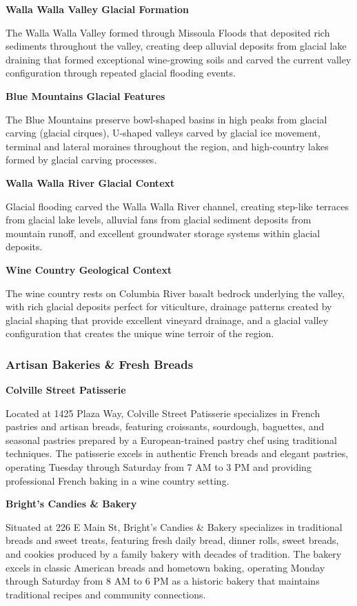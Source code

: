 \documentclass[
  11pt,
  letterpaper,
  DIV=10,
  numbers=noendperiod]{scrartcl}
\begin{document}
\textbf{Walla Walla Valley Glacial Formation}

The Walla Walla Valley formed through Missoula Floods that deposited
rich sediments throughout the valley, creating deep alluvial deposits
from glacial lake draining that formed exceptional wine-growing soils
and carved the current valley configuration through repeated glacial
flooding events.

\textbf{Blue Mountains Glacial Features}

The Blue Mountains preserve bowl-shaped basins in high peaks from
glacial carving (glacial cirques), U-shaped valleys carved by glacial
ice movement, terminal and lateral moraines throughout the region, and
high-country lakes formed by glacial carving processes.

\textbf{Walla Walla River Glacial Context}

Glacial flooding carved the Walla Walla River channel, creating
step-like terraces from glacial lake levels, alluvial fans from glacial
sediment deposits from mountain runoff, and excellent groundwater
storage systems within glacial deposits.

\textbf{Wine Country Geological Context}

The wine country rests on Columbia River basalt bedrock underlying the
valley, with rich glacial deposits perfect for viticulture, drainage
patterns created by glacial shaping that provide excellent vineyard
drainage, and a glacial valley configuration that creates the unique
wine terroir of the region.

\subsubsection{Artisan Bakeries \& Fresh
Breads}\label{artisan-bakeries-fresh-breads-3}

\textbf{Colville Street Patisserie}

Located at 1425 Plaza Way, Colville Street Patisserie specializes in
French pastries and artisan breads, featuring croissants, sourdough,
baguettes, and seasonal pastries prepared by a European-trained pastry
chef using traditional techniques. The patisserie excels in authentic
French breads and elegant pastries, operating Tuesday through Saturday
from 7 AM to 3 PM and providing professional French baking in a wine
country setting.

\textbf{Bright's Candies \& Bakery}

Situated at 226 E Main St, Bright's Candies \& Bakery specializes in
traditional breads and sweet treats, featuring fresh daily bread, dinner
rolls, sweet breads, and cookies produced by a family bakery with
decades of tradition. The bakery excels in classic American breads and
hometown baking, operating Monday through Saturday from 8 AM to 6 PM as
a historic bakery that maintains traditional recipes and community
connections.
\end{document}
